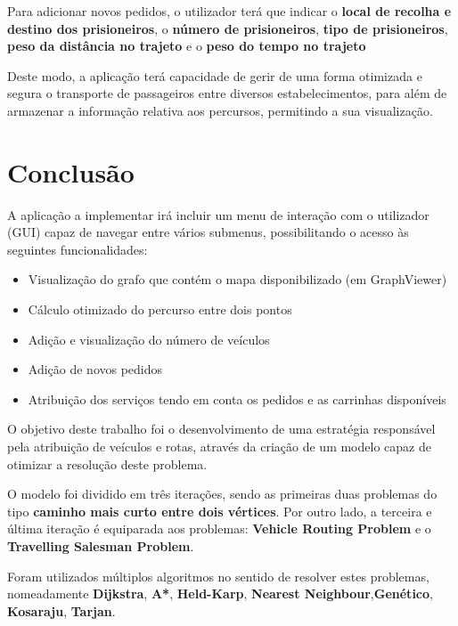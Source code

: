 \documentclass[article, a4paper, 12pt, oneside]{memoir}
\begin{document}
Para adicionar novos pedidos, o utilizador terá que indicar o \textbf{local de recolha e destino dos prisioneiros}, o \textbf{número de prisioneiros}, \textbf{tipo de prisioneiros}, \textbf{peso da distância no trajeto} e o \textbf{peso do tempo no trajeto}

Deste modo, a aplicação terá capacidade de gerir de uma forma otimizada e segura o transporte de passageiros entre diversos estabelecimentos, para além de armazenar a informação relativa aos percursos, permitindo a sua visualização.

\newpage
\chapter[Conclusão][Conclusão]{Conclusão} \label{\thechapter}

A aplicação a implementar irá incluir um menu de interação com o utilizador (GUI) capaz de navegar entre vários submenus, possibilitando o acesso às seguintes funcionalidades:

\begin{itemize}
	\item Visualização do grafo que contém o mapa disponibilizado (em GraphViewer)
	\item Cálculo otimizado do percurso entre dois pontos
	\item Adição e visualização do número de veículos
	\item Adição de novos pedidos
	\item Atribuição dos serviços tendo em conta os pedidos e as carrinhas disponíveis
\end{itemize}

O objetivo deste trabalho foi o desenvolvimento de uma estratégia responsável pela  atribuição de veículos e rotas, através da criação de um modelo capaz de otimizar a resolução deste problema.  

O modelo foi dividido em três iterações, sendo as primeiras duas problemas do tipo \textbf{caminho mais curto entre dois vértices}. Por outro lado, a terceira e última iteração é equiparada aos problemas: \textbf{Vehicle Routing Problem} e o \textbf{Travelling Salesman Problem}.  

Foram utilizados múltiplos algoritmos no sentido de resolver estes problemas, nomeadamente \textbf{Dijkstra}, \textbf{A*}, \textbf{Held-Karp}, \textbf{Nearest Neighbour},\textbf{Genético}, \textbf{Kosaraju}, \textbf{Tarjan}.
\end{document}
